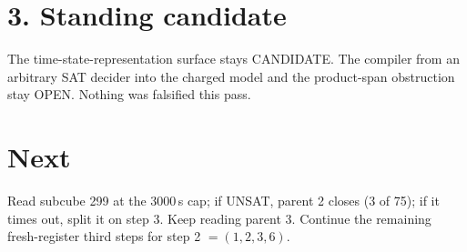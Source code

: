 \documentclass[11pt]{article}
\begin{document}
\section*{3. Standing candidate}
The time-state-representation surface stays CANDIDATE. The compiler from an arbitrary SAT decider into the charged model and the product-span obstruction stay OPEN. Nothing was falsified this pass.

\section*{Next}
Read subcube 299 at the 3000\,s cap; if UNSAT, parent 2 closes (3 of 75); if it times out, split it on step 3. Keep reading parent 3. Continue the remaining fresh-register third steps for step 2 $=(1,2,3,6)$.
\end{document}
